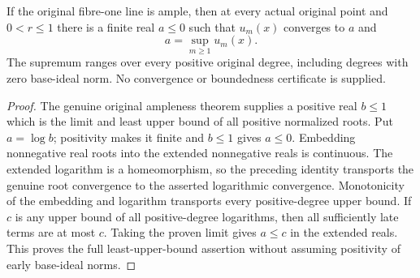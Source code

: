 \begin{theorem}\label{thm:native-tc-original-log-limit-and-supremum}
\leanok
If the original fibre-one line is ample, then at every actual original
point and $0<r\leq1$ there is a finite real $a\leq0$ such that
$u_m(x)$ converges to $a$ and
\[
 a=\sup_{m\geq1}u_m(x).
\]
The supremum ranges over every positive original degree, including
degrees with zero base-ideal norm. No convergence or boundedness
certificate is supplied.
\end{theorem}
\begin{proof}
The genuine original ampleness theorem supplies a positive real
$b\leq1$ which is the limit and least upper bound of all positive
normalized roots. Put $a=\log b$; positivity makes it finite and
$b\leq1$ gives $a\leq0$. Embedding nonnegative real roots into the
extended nonnegative reals is continuous. The extended logarithm is
a homeomorphism, so the preceding identity transports the genuine
root convergence to the asserted logarithmic convergence. Monotonicity
of the embedding and logarithm transports every positive-degree upper
bound. If $c$ is any upper bound of all positive-degree logarithms,
then all sufficiently late terms are at most $c$. Taking the proven
limit gives $a\leq c$ in the extended reals. This proves the full
least-upper-bound assertion without assuming positivity of early
base-ideal norms.
\end{proof}
